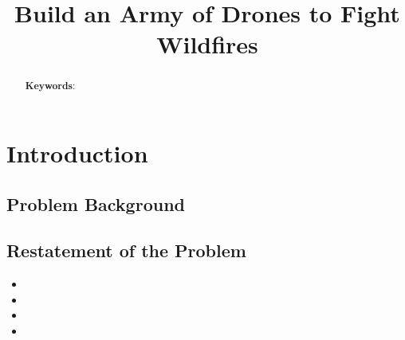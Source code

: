 \documentclass[12pt]{article}  %
\title{Build an Army of Drones to Fight Wildfires}  %
\begin{document}
\begin{abstract}
    


    \vspace{5pt}  %
    \textbf{Keywords}: 

\end{abstract}

\maketitle  %

\tableofcontents  %


\section{Introduction}

\subsection{Problem Background} %





\subsection{Restatement of the Problem} %



\begin{itemize} %
\setlength{\parsep}{0ex} %
\setlength{\topsep}{2ex} %
\setlength{\itemsep}{1ex} %
\item 
\item 
\item
\item 
\end{itemize}
\end{document}
